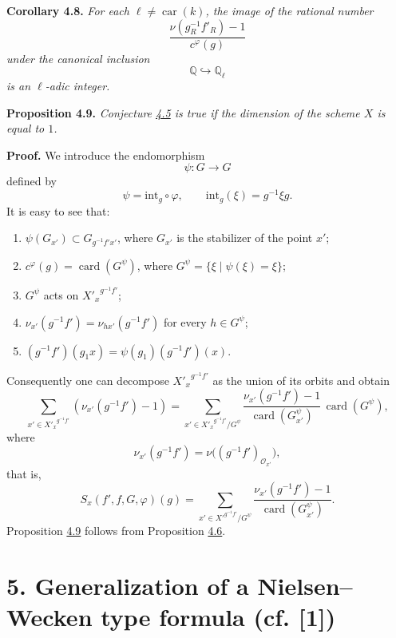 \documentclass[11pt]{article}
\providecommand{\car}{\operatorname{car}}
\providecommand{\car}{\operatorname{car}}
\providecommand{\bQ}{\mathbb Q}
\providecommand{\card}{\operatorname{card}}
\providecommand{\car}{\operatorname{car}}
\begin{document}
\medskip
\noindent
{}\label{sga5:XII:corollary:4.8}\textbf{Corollary 4.8.} \emph{For each $\ell\ne\car(k)$, the image of the rational number
\[
\frac{\nu(g_R^{-1}f'_R)-1}{c^\varphi(g)}
\]
under the canonical inclusion
\[
\bQ\hookrightarrow \bQ_\ell
\]
is an $\ell$-adic integer.}

\medskip
\noindent
{}\label{sga5:XII:proposition:4.9}\textbf{Proposition 4.9.} \emph{Conjecture \hyperref[sga5:XII:conjecture:4.5]{4.5} is true if the dimension of the scheme $X$ is equal to $1$.}

\medskip
\noindent
\textbf{Proof.} We introduce the endomorphism
\[
\psi:G\longrightarrow G
\]
defined by
\[
\psi=\mathrm{int}_g\circ\varphi,
\qquad \mathrm{int}_g(\xi)=g^{-1}\xi g.
\]
It is easy to see that:
\begin{enumerate}
\item[i)] $\psi(G_{x'})\subset G_{g^{-1}f'x'}$, where $G_{x'}$ is the stabilizer of the point $x'$;
\item[ii)] $c^\varphi(g)=\card(G^\psi)$, where $G^\psi=\{\xi\mid\psi(\xi)=\xi\}$;
\item[iii)] $G^\psi$ acts on ${X'_x}^{g^{-1}f'}$;
\item[iv)] $\nu_{x'}(g^{-1}f')=\nu_{hx'}(g^{-1}f')$ for every $h\in G^\psi$;
\item[v)] $(g^{-1}f')(g_1x)=\psi(g_1)(g^{-1}f')(x)$.
\end{enumerate}
Consequently one can decompose ${X'_x}^{g^{-1}f'}$ as the union of its orbits and obtain
\begin{equation}\tag{4.9.1}\label{sga5:XII:equation:4.9.1}
\sum_{x'\in {X'_x}^{g^{-1}f'}}(\nu_{x'}(g^{-1}f')-1)
=
\sum_{x'\in {X'_x}^{g^{-1}f'}/G^\psi}
\frac{\nu_{x'}(g^{-1}f')-1}{\card(G^\psi_{x'})}\,\card(G^\psi),
\end{equation}
where
\[
\nu_{x'}(g^{-1}f')=\nu\bigl((g^{-1}f')_{\mathcal O_{x'}}\bigr),
\]
that is,
\begin{equation}\tag{4.9.2}\label{sga5:XII:equation:4.9.2}
S_x(f',f,G,\varphi)(g)=\sum_{x'\in {X'}^{g^{-1}f'}/G^\psi}
\frac{\nu_{x'}(g^{-1}f')-1}{\card(G^\psi_{x'})}.
\end{equation}
\label{sga5:XII:proposition:4}Proposition \hyperref[sga5:XII:proposition:4.9]{4.9} follows from Proposition \hyperref[sga5:XII:proposition:4.6]{4.6}.

\section*{5. Generalization of a Nielsen--Wecken type formula {\normalfont (cf. [1])}}\label{sga5:XII:section:5}
\end{document}
